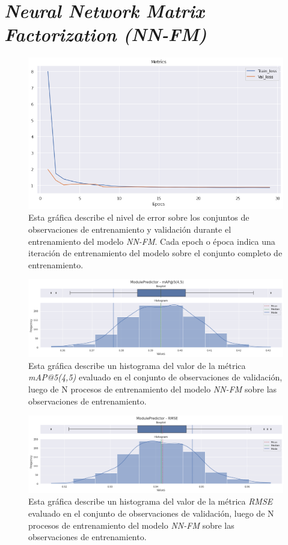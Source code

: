 \documentclass[11pt,a4paper,twoside]{thesis}
\begin{document}
{\section{\textit{Neural Network Matrix Factorization (NN-FM)}}

\begin{figure}[h!]
	\centering
	\includegraphics[width=13cm]{./images/metrics-NN-FM-train-val-loss.png}
	\caption{Esta gráfica describe el nivel de error sobre los conjuntos de observaciones de entrenamiento y validación durante el entrenamiento del modelo \textit{NN-FM}. Cada epoch o época indica una iteración de entrenamiento del modelo sobre el conjunto completo de entrenamiento.}
\end{figure}

\clearpage

\begin{figure}[h!]
	\centering
	\includegraphics[width=15cm]{./images/metrics-NN-FM-mapk.png}
	\caption{Esta gráfica describe un histograma del valor de la métrica \textit{mAP@5(4,5)} evaluado en el conjunto de observaciones de validación, luego de N procesos de entrenamiento del modelo \textit{NN-FM} sobre las observaciones de entrenamiento.}
\end{figure}

\begin{figure}[h!]
	\centering
	\includegraphics[width=15cm]{./images/metrics-NN-FM-RMSE.png}
	\caption{Esta gráfica describe un histograma del valor de la métrica \textit{RMSE} evaluado en el conjunto de observaciones de validación, luego de N procesos de entrenamiento del modelo \textit{NN-FM} sobre las observaciones de entrenamiento.}
\end{figure}

}
\end{document}
